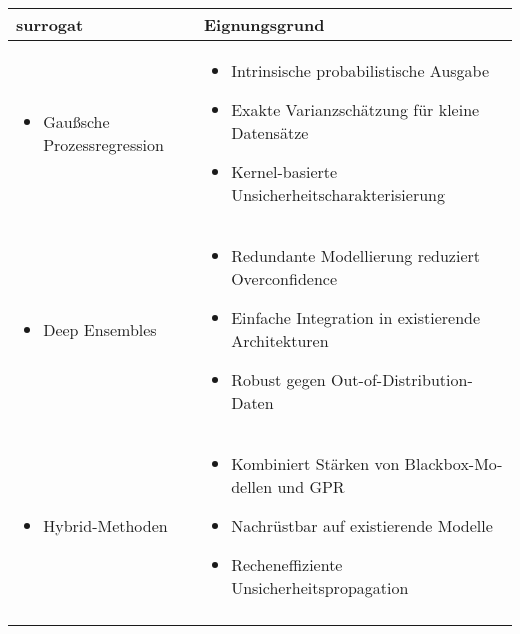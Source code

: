 \begin{otherlanguage}{ngerman}
\begin{table}[!htpb]
  \centering
  \begin{tabular}{|l|p{\dimexpr\textwidth-3cm-2\tabcolsep}|}  
    \hline
    \textbf{\gls{surrogat}} & \textbf{Eignungsgrund} \\
    \hline
    \begin{itemize}[topsep=0em, itemsep=0em, left=0em, labelsep=0.25em]
      \item \gls{Gaußsche Prozessregression}
    \end{itemize} &  
    \begin{itemize}[topsep=0em, itemsep=0em, left=0em, labelsep=0.25em]
      \item Intrinsische probabilistische Ausgabe
      \item Exakte Varianzschätzung für kleine Datensätze
      \item Kernel-basierte Unsicherheitscharakterisierung
    \end{itemize} \\ 
    \hline
    \begin{itemize}[topsep=0em, itemsep=0em, left=0em, labelsep=0.25em]
      \item Deep Ensembles
    \end{itemize} & 
    \begin{itemize}[topsep=0em, itemsep=0em, left=0em, labelsep=0.25em]
      \item Redundante Modellierung reduziert Overconfidence
      \item Einfache Integration in existierende Architekturen
      \item Robust gegen Out-of-Distribution-Daten
    \end{itemize} \\
    \hline
    \begin{itemize}[topsep=0em, itemsep=0em, left=0em, labelsep=0.25em]
      \item Hybrid-Methoden
    \end{itemize} & 
    \begin{itemize}[topsep=0em, itemsep=0em, left=0em, labelsep=0.25em]
      \item Kombiniert Stärken von Blackbox-Modellen und GPR
      \item Nachrüstbar auf existierende Modelle
      \item Recheneffiziente Unsicherheitspropagation
    \end{itemize} \\
    \hline
    \begin{itemize}[topsep=0em, itemsep=0em, left=0em, labelsep=0.25em]

\end{itemize}
\end{tabular}
\end{table}
\end{otherlanguage}
